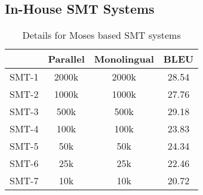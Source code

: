 \documentclass[11pt]{article}
\begin{document}
\subsection{In-House SMT Systems}
\begin{table}[ht]
\centering  %
\begin{tabular}{c c c c} %
\hline\hline                        %
 & Parallel & Monolingual & BLEU \\ [0.5ex] %
\hline                  %
SMT-1 & 2000k & 2000k & 28.54 \\ %
SMT-2 & 1000k & 1000k & 27.76 \\ %
SMT-3 & 500k & 500k & 29.18 \\ %
SMT-4 & 100k & 100k & 23.83 \\ 
SMT-5 & 50k & 50k & 24.34 \\ %
SMT-6 & 25k & 25k & 22.46 \\ %
SMT-7 & 10k & 10k & 20.72 \\ %
[1ex] %

\hline %
\end{tabular}
\caption{Details for Moses based SMT systems} %
\label{table:moses} %
\end{table}
\end{document}
